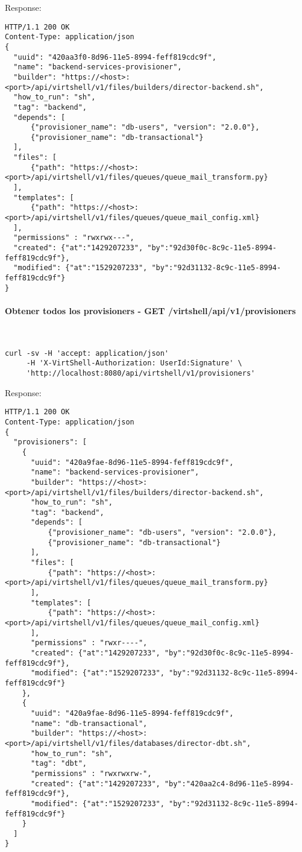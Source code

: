 Response:

\begin{lstlisting}[style=json]
HTTP/1.1 200 OK
Content-Type: application/json
{
  "uuid": "420aa3f0-8d96-11e5-8994-feff819cdc9f",
  "name": "backend-services-provisioner",
  "builder": "https://<host>:<port>/api/virtshell/v1/files/builders/director-backend.sh",
  "how_to_run": "sh",
  "tag": "backend",
  "depends": [
      {"provisioner_name": "db-users", "version": "2.0.0"},
      {"provisioner_name": "db-transactional"}
  ],
  "files": [
      {"path": "https://<host>:<port>/api/virtshell/v1/files/queues/queue_mail_transform.py}
  ],
  "templates": [
      {"path": "https://<host>:<port>/api/virtshell/v1/files/queues/queue_mail_config.xml}
  ],
  "permissions" : "rwxrwx---",        
  "created": {"at":"1429207233", "by":"92d30f0c-8c9c-11e5-8994-feff819cdc9f"},
  "modified": {"at":"1529207233", "by":"92d31132-8c9c-11e5-8994-feff819cdc9f"}
}
\end{lstlisting}

\paragraph{Obtener todos los provisioners - GET /virtshell/api/v1/provisioners} ~\\

\begin{lstlisting}[style=json]
curl -sv -H 'accept: application/json' 
     -H 'X-VirtShell-Authorization: UserId:Signature' \ 
     'http://localhost:8080/api/virtshell/v1/provisioners'
\end{lstlisting}

Response:

\begin{lstlisting}[style=json]
HTTP/1.1 200 OK
Content-Type: application/json
{
  "provisioners": [
    { 
      "uuid": "420a9fae-8d96-11e5-8994-feff819cdc9f",
      "name": "backend-services-provisioner",
      "builder": "https://<host>:<port>/api/virtshell/v1/files/builders/director-backend.sh",
      "how_to_run": "sh",
      "tag": "backend",
      "depends": [
          {"provisioner_name": "db-users", "version": "2.0.0"},
          {"provisioner_name": "db-transactional"}
      ],
      "files": [
          {"path": "https://<host>:<port>/api/virtshell/v1/files/queues/queue_mail_transform.py}
      ],
      "templates": [
          {"path": "https://<host>:<port>/api/virtshell/v1/files/queues/queue_mail_config.xml}
      ],
      "permissions" : "rwxr----",      
      "created": {"at":"1429207233", "by":"92d30f0c-8c9c-11e5-8994-feff819cdc9f"},
      "modified": {"at":"1529207233", "by":"92d31132-8c9c-11e5-8994-feff819cdc9f"}
    },
    { 
      "uuid": "420a9fae-8d96-11e5-8994-feff819cdc9f",
      "name": "db-transactional",
      "builder": "https://<host>:<port>/api/virtshell/v1/files/databases/director-dbt.sh",
      "how_to_run": "sh",
      "tag": "dbt",
      "permissions" : "rwxrwxrw-",        
      "created": {"at":"1429207233", "by":"420aa2c4-8d96-11e5-8994-feff819cdc9f"},
      "modified": {"at":"1529207233", "by":"92d31132-8c9c-11e5-8994-feff819cdc9f"}
    }    
  ]
} 
\end{lstlisting}

